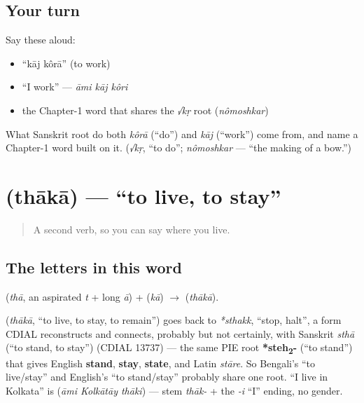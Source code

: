 \subsection*{Your turn}
Say these aloud:

\begin{itemize}
\raggedright
  \item \textquotedblleft{}kāj kôrā\textquotedblright{} (to work)
  \item \textquotedblleft{}I work\textquotedblright{} — \emph{āmi kāj kôri}
  \item the Chapter-1 word that shares the \emph{√kṛ} root (\emph{nômoshkar})
\end{itemize}

\begin{tcolorbox}[breakable,colback=teal!4,colframe=teal!35!black,title={Before you move on}]
What Sanskrit root do both \emph{kôrā} (\textquotedblleft{}do\textquotedblright{}) and \emph{kāj} (\textquotedblleft{}work\textquotedblright{}) come from, and name a Chapter-1 word built on it. (\emph{√kṛ}, \textquotedblleft{}to do\textquotedblright{}; \emph{nômoshkar} — \textquotedblleft{}the making of a bow.\textquotedblright{})
\end{tcolorbox}
\section[\texorpdfstring{\bn{থাকা} (thākā)}{থাকা (thākā)}]{ (thākā) — \textquotedblleft{}to live, to stay\textquotedblright{}}

\label{lesson:BN-C05-thaka}



\begin{quote}
A second verb, so you can say where you live.
\end{quote}

\subsection*{The letters in this word}
\textbf{} (\emph{thā}, an aspirated \emph{t} + long \emph{ā}) + \textbf{} (\emph{kā}) $\to$ \textbf{} (\emph{thākā}).

\begin{cousinweb}
\textbf{} (\emph{thākā}, \textquotedblleft{}to live, to stay, to remain\textquotedblright{}) goes back to \emph{*sthakk}, \textquotedblleft{}stop, halt\textquotedblright{}, a form CDIAL reconstructs and connects, probably but not certainly, with Sanskrit \emph{sthā} (\textquotedblleft{}to stand, to stay\textquotedblright{}) (CDIAL 13737) — the same PIE root \textbf{*steh\textsubscript{2}-} (\textquotedblleft{}to stand\textquotedblright{}) that gives English \textbf{stand}, \textbf{stay}, \textbf{state}, and Latin \emph{stāre}. So Bengali's \textquotedblleft{}to live/stay\textquotedblright{} and English's \textquotedblleft{}to stand/stay\textquotedblright{} probably share one root. \textquotedblleft{}I live in Kolkata\textquotedblright{} is \textbf{  } (\emph{āmi Kolkātāy thāki}) — stem \emph{thāk-} + the \emph{-i} \textquotedblleft{}I\textquotedblright{} ending, no gender.
\end{cousinweb}

